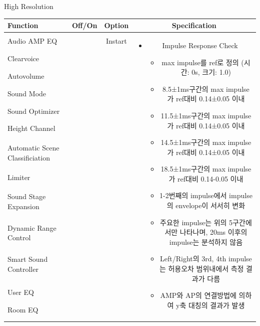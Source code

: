\documentclass{beamer}
\begin{document}
	\begin{frame}[t]{High Resolution}
		\begin{tiny}
			\begin{tabular}{@{}lccc@{}}
				\toprule
				Function & Off/On & Option & Specification \\
				\midrule
				Audio AMP EQ & \color{black}{Off} & Instart &
				\multirow{14}{60mm}{
					\begin{itemize}
						\item Impulse Response Check
						\begin{itemize}
							\item max impulse를 ref로 정의 (시간: 0s, 크기: 1.0)
							\item 8.5±1ms구간의 max impulse가 ref대비 0.14±0.05 이내
							\item 11.5±1ms구간의 max impulse가 ref대비 0.14±0.05 이내
							\item 14.5±1ms구간의 max impulse가 ref대비 0.14±0.05 이내
							\item 18.5±1ms구간의 max impulse가 ref대비 0.14-0.05 이내
							\item 1-2번째의 impulse에서 impulse의 envelope이 서서히 변화
							\item 주요한 impulse는 위의 5구간에서만 나타나며, 20ms 이후의 impulse는 분석하지 않음
							\item Left/Right의 3rd, 4th impulse는 허용오차 범위내에서 측정 결과가 다름
							\item AMP와 AP의 연결방법에 의하여 y축 대칭의 결과가 발생
						\end{itemize}
					\end{itemize}
				} \\
				Clearvoice & \color{black}{Off} & & \\
				Autovolume & \color{black}{Off} & & \\
				Sound Mode & \color{black}{Off} & & \\
				Sound Optimizer & \color{black}{Off} & & \\
				Height Channel & \color{black}{Off} & & \\
				Automatic Scene Classificiation & \color{black}{Off} & & \\
				Limiter & \color{black}{Off} & & \\
				Sound Stage Expansion & \color{black}{Off} & & \\
				Dynamic Range Control & \color{black}{Off} & & \\
				Smart Sound Controller & \color{black}{Off} & & \\
				\color{blue}{High Resolution} & \color{blue}{On} & & \\
				User EQ & \color{black}{Off} & & \\
				Room EQ & \color{black}{Off} & & \\
				\color{blue}{OSD Volume} & \color{blue}{On} &  \color{blue}{Vol.40} & \\
				\midrule
			\end{tabular}
		\end{tiny}
		

\end{frame}
\end{document}
